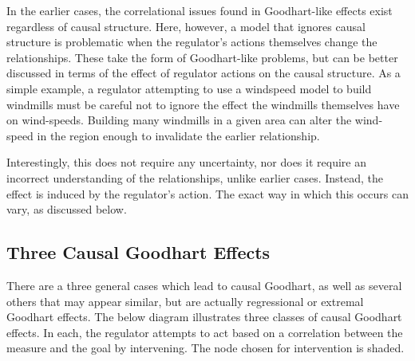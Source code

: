 \documentclass[10pt]{article}
\begin{document}
\noindent In the earlier cases, the correlational issues found in Goodhart-like effects exist regardless of causal structure. Here, however, a model that ignores causal structure is problematic when the regulator's actions themselves change the relationships. These take the form of Goodhart-like problems, but can be better discussed in terms of the effect of regulator actions on the causal structure. As a simple example, a regulator attempting to use a windspeed model to build windmills must be careful not to ignore the effect the windmills themselves have on wind-speeds. Building many windmills in a given area can alter the wind-speed in the region enough to invalidate the earlier relationship.

Interestingly, this does not require any uncertainty, nor does it require an incorrect understanding of the relationships, unlike earlier cases. Instead, the effect is induced by the regulator's action. The exact way in which this occurs can vary, as discussed below.

\subsection*{Three Causal Goodhart Effects}

There are a three general cases which lead to causal Goodhart, as well as several others that may appear similar, but are actually regressional or extremal Goodhart effects. The below diagram illustrates three classes of causal Goodhart effects. In each, the regulator attempts to act based on a correlation between the measure and the goal by intervening. The node chosen for intervention is shaded.
\end{document}
